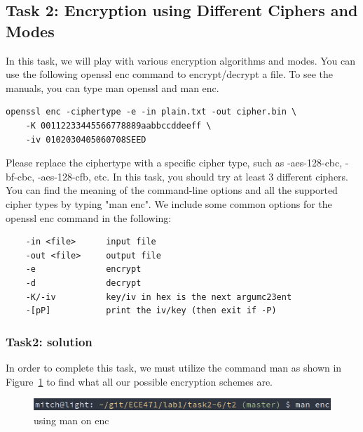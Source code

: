 \documentclass[12pt]{article}
\begin{document}
\subsection{Task 2: Encryption using Different Ciphers and Modes}

In this task, we will play with various encryption algorithms and modes. You can use the following
openssl enc command to encrypt/decrypt a file. To see the manuals, you can type man openssl
and man enc.

\begin{verbatim}
openssl enc -ciphertype -e -in plain.txt -out cipher.bin \
    -K 00112233445566778889aabbccddeeff \
    -iv 0102030405060708SEED 
\end{verbatim}

Please replace the ciphertype with a specific cipher type, such as -aes-128-cbc, -bf-cbc,
-aes-128-cfb, etc. In this task, you should try at least 3 different ciphers. You can find the meaning
of the command-line options and all the supported cipher types by typing "man enc". We include some
common options for the openssl enc command in the following:
\begin{verbatim}
    -in <file>      input file
    -out <file>     output file
    -e              encrypt
    -d              decrypt
    -K/-iv          key/iv in hex is the next argumc23ent
    -[pP]           print the iv/key (then exit if -P)
\end{verbatim}

\subsubsection{Task2: solution}

In order to complete this task, we must utilize the command man as shown in Figure~\ref{fig:t2p0} to find what all our possible encryption schemes are.

\begin{figure}[H]
    \begin{center}
        \includegraphics[scale=0.48]{t2p0.png}
    \end{center}{}
    \caption{using man on enc}
    \label{fig:t2p0}
\end{figure}
\end{document}
